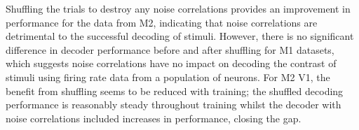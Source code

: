Shuffling the trials to destroy any noise correlations provides an improvement in performance for the data from \ac{M2}, indicating that noise correlations are detrimental to the successful decoding of stimuli.
However, there is no significant difference in decoder performance before and after shuffling for \ac{M1} datasets, which suggests noise correlations have no impact on decoding the contrast of stimuli using firing rate data from a population of neurons.
For \ac{M2} \ac{V1}, the benefit from shuffling seems to be reduced with training; the shuffled decoding performance is reasonably steady throughout training whilst the decoder with noise correlations included increases in performance, closing the gap.



